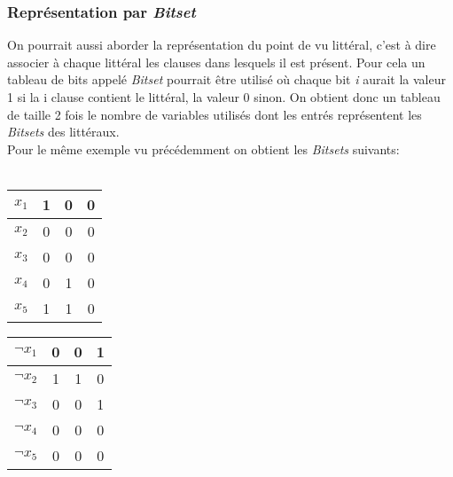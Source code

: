 \subsubsection{Représentation par \textit{Bitset}}
On pourrait aussi aborder la représentation du point de vu littéral, c’est à dire associer à chaque littéral les clauses dans lesquels il est présent. Pour cela un tableau de bits appelé \textit{Bitset} pourrait être utilisé où chaque bit \textit{i} aurait la valeur 1 si la i clause contient le littéral, la valeur 0 sinon. On obtient donc un tableau de taille 2 fois le nombre de variables utilisés dont les entrés représentent les \textit{Bitsets} des littéraux.\\
Pour le même exemple vu précédemment on obtient les \textit{Bitsets} suivants:\\\\
	\begin{minipage}{0.5\textwidth}
		\centering
		\begin{tabular}{|c | c| c| c|}
			\hline
			$x_{1}$& 1 & 0 & 0 \\\hline
			$x_{2}$& 0 & 0 & 0 \\\hline
			$x_{3}$& 0 & 0 & 0 \\\hline
			$x_{4}$& 0 & 1 & 0 \\\hline
			$x_{5}$& 1 & 1 & 0 \\\hline
		\end{tabular}
	\end{minipage}
	\hfillx
	\begin{minipage}{0.5\textwidth}
		\centering
		\begin{tabular}{|c | c| c| c|}
			\hline
			$\neg x_{1}$& 0 & 0 & 1 \\\hline
			$\neg x_{2}$& 1 & 1 & 0 \\\hline
			$\neg x_{3}$& 0 & 0 & 1 \\\hline
			$\neg x_{4}$& 0 & 0 & 0 \\\hline
			$\neg x_{5}$& 0 & 0 & 0 \\\hline
		\end{tabular}
	\end{minipage}

